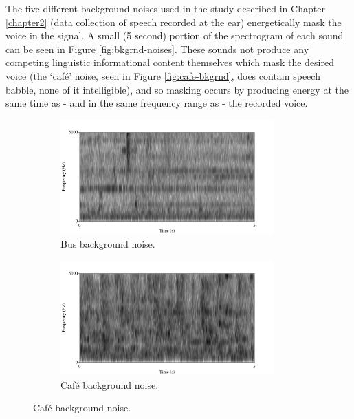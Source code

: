 \DIFaddend 


The five different background noises used in the study described in Chapter \ref{chapter2} (data collection of speech recorded at the ear) energetically mask the voice in the signal.  A small (5 second) portion of the spectrogram of each sound can be seen in Figure \ref{fig:bkgrnd-noises}.  These sounds \DIFdelbegin {}\DIFdelend \DIFaddbegin {}\DIFaddend not produce any competing linguistic informational content themselves which mask the desired voice (the `caf\'{e}' noise, seen in Figure \ref{fig:cafe-bkgrnd}, does contain speech babble, none of it intelligible), and so masking occurs by producing energy at the same time as - and in the same frequency range as - the recorded voice.

\begin{figure}[h!]
\begin{subfigure}{0.475\linewidth}
  \centering
  \includegraphics[width=0.9\textwidth]{figure/spctgrm-bus-background.png}
  \caption{Bus background noise.}
  \label{fig:bus-bkgrnd}
\end{subfigure}
\qquad
\begin{subfigure}{0.475\linewidth}
  \centering
  \includegraphics[width=0.9\textwidth]{figure/spctgrm-cafe-background.png}
  \caption{Caf\'{e} background noise.}

\end{subfigure}
\end{figure}
